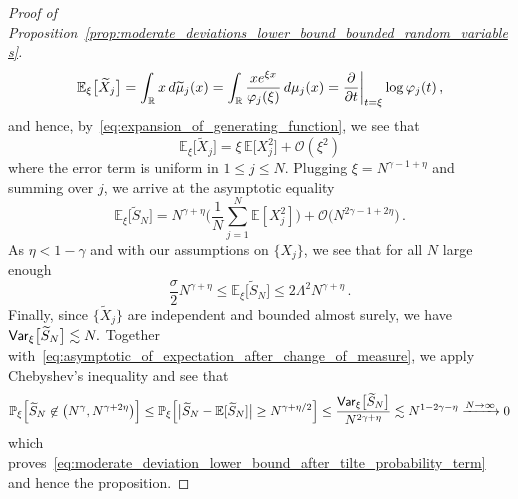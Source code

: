 \documentclass[11pt]{amsart}
\theoremstyle{definition}
\theoremstyle{remark}
\numberwithin{equation}{section}
\def\La{{\Lambda}}
\newcommand{\bR}{\mathbb R}
\newcommand{\bP}{\mathbb P}
\newcommand{\bE}{\mathbb E}
\newcommand{\Var}{{\sf Var}}
\begin{document}
\begin{proof}[Proof of Proposition~\ref{prop:moderate_deviations_lower_bound_bounded_random_variables}]
\begin{align*}
			\bE_\xi\big[\widetilde{X}_j\big] = \int_{\bR} x \, {\rm d}\widetilde\mu_j(x) = \int_{\bR} \frac{xe^{\xi x}}{\varphi_j(\xi)} \, {\rm d} \mu_j(x) = \frac{\partial}{\partial t} \bigg|_{t=\xi} \log \varphi_j(t) \, , 
		\end{align*}
		and hence, by~\eqref{eq:expansion_of_generating_function}, we see that
		\[
		\bE_\xi\big[\widetilde{X}_j\big] = \xi \, \bE\big[X_j^2\big] + \mathcal{O} (\xi^2)
		\]
		where the error term is uniform in $1\le j\le N$. Plugging $\xi = N^{\gamma-1+\eta}$ and summing over $j$, we arrive at the asymptotic equality
		\begin{equation*}
			\bE_\xi\big[\widetilde{S}_N\big] = N^{\gamma+\eta} \Big(\frac{1}{N} \sum_{j=1}^{N} \bE[X_j^2]\Big) + \mathcal{O}\big(N^{2\gamma-1+2\eta}\big) \, .
		\end{equation*}
		As $\eta<1-\gamma$ and with our assumptions on $\{X_j\}$, we see that for all $N$ large enough
		\begin{equation}
			\label{eq:asymptotic_of_expectation_after_change_of_measure}
			\frac{\sigma}{2} N^{\gamma+\eta} \le \bE_\xi\big[\widetilde{S}_N\big] \le 2\La^2 N^{\gamma+\eta} \, .
		\end{equation}
		Finally, since $\{\widetilde{X}_j\}$ are independent and bounded almost surely, we have
		$ \Var_\xi \big[\widetilde{S}_N\big] \lesssim N .
		$ 
		Together with~\eqref{eq:asymptotic_of_expectation_after_change_of_measure}, we apply Chebyshev's inequality and see that
		\begin{equation*}
			\bP_\xi \Big[\widetilde{S}_N \not\in \big(N^\gamma, N^{\gamma+2\eta}\big)\Big] \le \bP_\xi \Big[ \big|\widetilde{S}_N - \bE[\widetilde{S}_N]\big| \ge N^{\gamma + \eta/2}\Big] \le \frac{\Var_\xi \big[\widetilde{S}_N\big]}{N^{2\gamma +\eta}} \lesssim N^{1-2\gamma -\eta} \xrightarrow{N\to \infty} 0
		\end{equation*}
		which proves~\eqref{eq:moderate_deviation_lower_bound_after_tilte_probability_term} and hence the proposition.
	\end{proof}
	
	\printbibliography[heading=bibliography]%
	
	\hspace{10mm}
\end{document}

